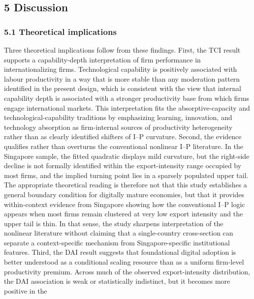 \documentclass[12pt,a4paper]{article}
\begin{document}
\hypertarget{5-discussion}{%
\subsection{5 Discussion}\label{5-discussion}}

\hypertarget{51-theoretical-implications}{%
\subsubsection{5.1 Theoretical
implications}\label{51-theoretical-implications}}

Three theoretical implications follow from these findings. First, the
TCI result supports a capability-depth interpretation of firm
performance in internationalizing firms. Technological capability is
positively associated with labour productivity in a way that is more
stable than any moderation pattern identified in the present design,
which is consistent with the view that internal capability depth is
associated with a stronger productivity base from which firms engage
international markets. This interpretation fits the absorptive-capacity
and technological-capability traditions by emphasizing learning,
innovation, and technology absorption as firm-internal sources of
productivity heterogeneity rather than as clearly identified shifters of
I--P curvature. Second, the evidence qualifies rather than overturns the
conventional nonlinear I--P literature. In the Singapore sample, the
fitted quadratic displays mild curvature, but the right-side decline is
not formally identified within the export-intensity range occupied by
most firms, and the implied turning point lies in a sparsely populated
upper tail. The appropriate theoretical reading is therefore not that
this study establishes a general boundary condition for digitally mature
economies, but that it provides within-context evidence from Singapore
showing how the conventional I--P logic appears when most firms remain
clustered at very low export intensity and the upper tail is thin. In
that sense, the study sharpens interpretation of the nonlinear
literature without claiming that a single-country cross-section can
separate a context-specific mechanism from Singapore-specific
institutional features. Third, the DAI result suggests that foundational
digital adoption is better understood as a conditional scaling resource
than as a uniform firm-level productivity premium. Across much of the
observed export-intensity distribution, the DAI association is weak or
statistically indistinct, but it becomes more positive in the
\end{document}
